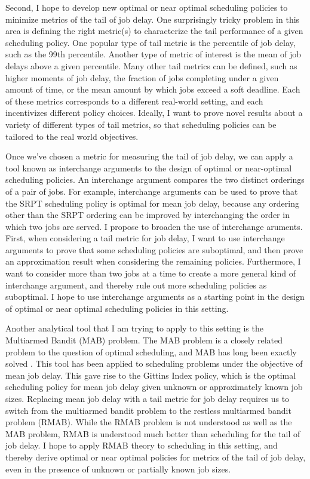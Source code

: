 \documentclass[11pt]{article}
\begin{document}
Second, I hope to develop new optimal or near optimal scheduling policies
to minimize metrics of the tail of job delay.
One surprisingly tricky problem in this area is defining the right metric(s)
to characterize the tail performance of a given scheduling policy.
One popular type of tail metric is the percentile of job delay,
such as the 99th percentile.
Another type of metric of interest is the mean of job delays above a given percentile.
Many other tail metrics can be defined,
such as higher moments of job delay,
the fraction of jobs completing under a given amount of time,
or the mean amount by which jobs exceed a soft deadline.
Each of these metrics corresponds to a different real-world setting,
and each incentivizes different policy choices.
Ideally, I want to prove novel results about a variety of different types of tail metrics,
so that scheduling policies can be tailored to the real world objectives.

Once we've chosen a metric for measuring the tail of job delay,
we can apply a tool known as interchange arguments
to the design of optimal or near-optimal scheduling policies.
An interchange argument compares the two distinct orderings of a pair of jobs.
For example, interchange arguments can be used to prove that the SRPT scheduling policy
is optimal for mean job delay,
because any ordering other than the SRPT ordering can be improved by interchanging
the order in which two jobs are served.
I propose to broaden the use of interchange aruments.
First, when considering a tail metric for job delay,
I want to use interchange arguments to prove that some scheduling policies are suboptimal,
and then prove an approximation result when considering the remaining policies.
Furthermore, I want to consider more than two jobs at a time
to create a more general kind of interchange argument,
and thereby rule out more scheduling policies as suboptimal.
I hope to use interchange arguments as a starting point in the design of
optimal or near optimal scheduling policies in this setting.

Another analytical tool that I am trying to apply to this setting
is the Multiarmed Bandit (MAB) problem.
The MAB problem is a closely related problem to the question of optimal scheduling,
and MAB has long been exactly solved \cite{doi:10.1111/j.2517-6161.1979.tb01068.x}.
This tool has been applied to scheduling problems under the objective of mean job delay.
This gave rise to the Gittins Index policy,
which is the optimal scheduling policy for mean job delay
given unknown or approximately known job sizes.
Replacing mean job delay with a tail metric for job delay
requires us to switch from the multiarmed bandit problem
to the restless multiarmed bandit problem (RMAB).
While the RMAB problem is not understood as well as the MAB problem,
RMAB is understood much better than scheduling for the tail of job delay.
I hope to apply RMAB theory to scheduling in this setting,
and thereby derive optimal or near optimal policies for metrics of the tail of job delay,
even in the presence of unknown or partially known job sizes.
\end{document}
